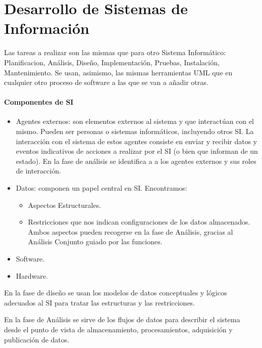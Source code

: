 \documentclass[12pt]{book} %
\providecommand{\tightlist}{%
  \setlength{\itemsep}{0pt}\setlength{\parskip}{0pt}}
\begin{document}
\hypertarget{desarrollo-de-sistemas-de-informaciuxf3n}{%
\chapter{Desarrollo de Sistemas de
Información}\label{desarrollo-de-sistemas-de-informaciuxf3n}}

Las tareas a realizar son las mismas que para otro Sistema Informático:
Planificacion, Análisis, Diseño, Implementación, Pruebas, Instalación,
Mantenimiento. Se usan, asimismo, las mismas herramientas UML que en
cualquier otro proceso de software a las que se van a añadir otras.

\subsubsection*{Componentes de SI}

\begin{itemize}
\tightlist
\item
  Agentes externos: son elementos externos al sistema y que interactúan
  con el mismo. Pueden ser personas o sistemas informáticos, incluyendo
  otros SI. La interacción con el sistema de estos agentes consiste en
  enviar y recibir datos y eventos indicativos de acciones a realizar
  por el SI (o bien que informan de un estado). En la fase de análisis
  se identifica a a los agentes externos y sus roles de interacción.
\item
  Datos: componen un papel central en SI. Encontramos:

  \begin{itemize}
  \tightlist
  \item
    Aspectos Estructurales.
  \item
    Restricciones que nos indican configuraciones de los datos
    almacenados. Ambos aspectos pueden recogerse en la fase de Análisis,
    gracias al Análisis Conjunto guiado por las funciones.
  \end{itemize}
\item
  Software.
\item
  Hardware.
\end{itemize}

En la fase de diseño se usan los modelos de datos conceptuales y lógicos
adecuados al SI para tratar las estructuras y las restricciones.

En la fase de Análisis se sirve de los flujos de datos para describir el
sistema desde el punto de vista de almacenamiento, procesamientos,
adquisición y publicación de datos.
\end{document}
